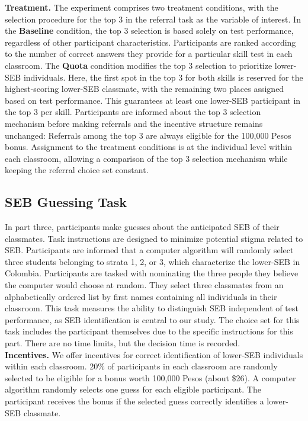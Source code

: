 \documentclass[11pt,a4paper,oneside]{article}
\begin{document}
\textbf{Treatment.} The experiment comprises two treatment conditions, with the selection procedure for the top 3 in the referral task as the variable of interest. In the \textbf{Baseline} condition, the top 3 selection is based solely on test performance, regardless of other participant characteristics. Participants are ranked according to the number of correct answers they provide for a particular skill test in each classroom. The \textbf{Quota} condition modifies the top 3 selection to prioritize lower-SEB individuals. Here, the first spot in the top 3 for both skills is reserved for the highest-scoring lower-SEB classmate, with the remaining two places assigned based on test performance. This guarantees at least one lower-SEB participant in the top 3 per skill. Participants are informed about the top 3 selection mechanism before making referrals and the incentive structure remains unchanged: Referrals among the top 3 are always eligible for the 100,000 Pesos bonus. Assignment to the treatment conditions is at the individual level within each classroom, allowing a comparison of the top 3 selection mechanism while keeping the referral choice set constant.

\subsection{SEB Guessing Task}\label{guessing_task}
In part three, participants make guesses about the anticipated SEB of their classmates. Task instructions are designed to minimize potential stigma related to SEB. Participants are informed that a computer algorithm will randomly select three students belonging to strata 1, 2, or 3, which characterize the lower-SEB in Colombia. Participants are tasked with nominating the three people they believe the computer would choose at random. They select three classmates from an alphabetically ordered list by first names containing all individuals in their classroom. This task measures the ability to distinguish SEB independent of test performance, as SEB identification is central to our study. The choice set for this task includes the participant themselves due to the specific instructions for this part. There are no time limits, but the decision time is recorded. \medskip\\ 
\textbf{Incentives.} We offer incentives for correct identification of lower-SEB individuals within each classroom. 20\% of participants in each classroom are randomly selected to be eligible for a bonus worth 100,000 Pesos (about \$26). A computer algorithm randomly selects one guess for each eligible participant. The participant receives the bonus if the selected guess correctly identifies a lower-SEB classmate.
\end{document}
